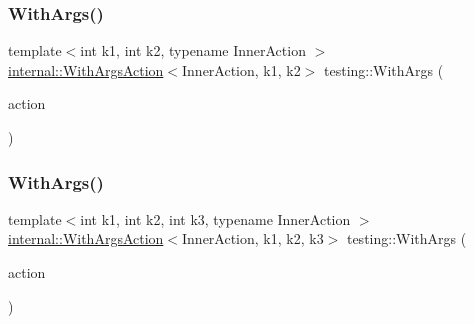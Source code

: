 \mbox{\label{namespacetesting_aa82fc09250ba172220e6fb7e77249e74}} 
\subsubsection{\texorpdfstring{With\+Args()}{WithArgs()}\hspace{0.1cm}{\footnotesize\ttfamily [2/10]}}
{\footnotesize\ttfamily template$<$int k1, int k2, typename Inner\+Action $>$ \\
\hyperlink{classtesting_1_1internal_1_1_with_args_action}{internal\+::\+With\+Args\+Action}$<$Inner\+Action, k1, k2$>$ testing\+::\+With\+Args (\begin{DoxyParamCaption}\item[{const Inner\+Action \&}]{action }\end{DoxyParamCaption})\hspace{0.3cm}{\ttfamily [inline]}}

\mbox{\label{namespacetesting_a999614cb785165b9a44a9a95a3753407}} 
\subsubsection{\texorpdfstring{With\+Args()}{WithArgs()}\hspace{0.1cm}{\footnotesize\ttfamily [3/10]}}
{\footnotesize\ttfamily template$<$int k1, int k2, int k3, typename Inner\+Action $>$ \\
\hyperlink{classtesting_1_1internal_1_1_with_args_action}{internal\+::\+With\+Args\+Action}$<$Inner\+Action, k1, k2, k3$>$ testing\+::\+With\+Args (\begin{DoxyParamCaption}\item[{const Inner\+Action \&}]{action }\end{DoxyParamCaption})\hspace{0.3cm}{\ttfamily [inline]}}

\mbox{\label{namespacetesting_a646a2e4ac7866ee8c486cb167ba9b45e}} 

